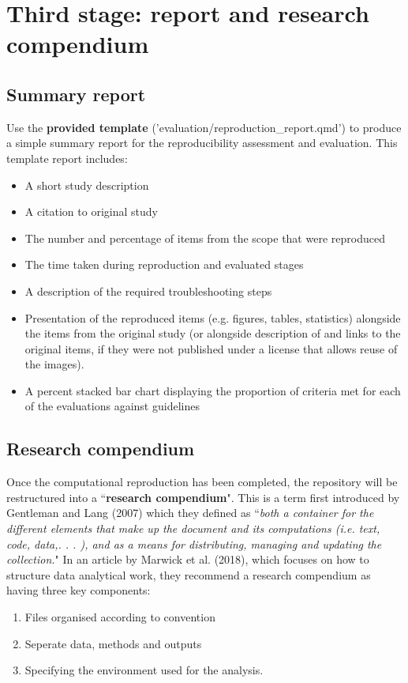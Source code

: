 \section{Third stage: report and research compendium}

\subsection{Summary report} \label{sec:report}

Use the \textbf{provided template} ('evaluation/reproduction\_report.qmd')\autocite{heather_template_2024} to produce a simple summary report for the reproducibility assessment and evaluation. This template report includes:

\begin{itemize}
    \item A short study description
    \item A citation to original study
    \item The number and percentage of items from the scope that were reproduced
    \item The time taken during reproduction and evaluated stages
    \item A description of the required troubleshooting steps
    \item Presentation of the reproduced items (e.g. figures, tables, statistics) alongside the items from the original study (or alongside description of and links to the original items, if they were not published under a license that allows reuse of the images).
    \item A percent stacked bar chart displaying the proportion of criteria met for each of the evaluations against guidelines
\end{itemize}

\vspace{0.5cm}
\subsection{Research compendium} \label{sec:compendium}

Once the computational reproduction has been completed, the repository will be restructured into a ``\textbf{research compendium}". This is a term first introduced by Gentleman and Lang (2007)\autocite{gentleman_statistical_2007} which they defined as ``\textit{both a container for the different elements that make up the document and its computations (i.e. text, code, data,. . . ), and as a means for distributing, managing and updating the collection.}"\autocite{gentleman_statistical_2007} In an article by Marwick et al. (2018),\autocite{marwick_packaging_2018} which focuses on how to structure data analytical work, they recommend a research compendium as having three key components:
\begin{enumerate}
    \item Files organised according to convention
    \item Seperate data, methods and outputs
    \item Specifying the environment used for the analysis.\autocite{marwick_packaging_2018}
\end{enumerate}

